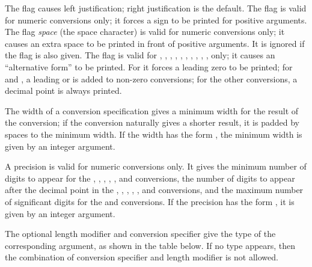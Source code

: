 The flag \code{-} causes left justification; right justification is the
default.  The flag \code{+} is valid for numeric conversions only; it
forces a \code{+} sign to be printed for positive arguments.  The flag
\emph{space} (the space character) is valid for numeric conversions only;
it causes an extra space to be printed in front of positive arguments.
It is ignored if the \code{+} flag is also given.
The flag \code{\#} is valid for , , , ,
, , , , , , 
only; it causes an ``alternative form'' to be printed.  For  it
forces a leading zero to be printed; for  and , a
leading  or  is added to non-zero conversions; for the
other conversions, a decimal point is always printed.

The width of a conversion specification gives a minimum width for the
result of the conversion; if the conversion naturally gives a shorter
result, it is padded by spaces to the minimum width.  If the width has
the form \code{*}, the minimum width is given by an integer argument.

A precision is valid for numeric conversions only.  It gives the minimum
number of digits to appear for the , , ,
, , and  conversions, the number of digits to
appear after the decimal point in the , , ,
, , and  conversions, and the maximum number of
significant digits for the  and  conversions.  If the
precision has the form  \code{*}, it is given by an integer
argument.

The optional length modifier and conversion specifier give the type of
the corresponding argument, as shown in the table below.  If no type
appears, then the combination of conversion specifier and length
modifier is not allowed.

